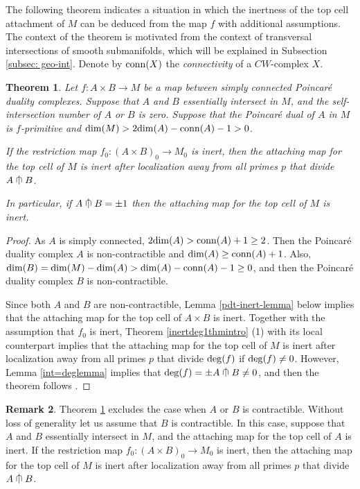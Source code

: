 \documentclass[a4]{amsart}
\newtheorem{theorem}{Theorem}[section]
\theoremstyle{definition}
\newtheorem{remark}[theorem]{Remark}
\newcommand{\testcap}{\mathrel{\vcenter{\offinterlineskip
\hbox{$\cap$}\vskip-1.8ex\hbox{$\kern0.2em | \kern0.15em$}}}}
\begin{document}
\begin{sloppypar}
The following theorem indicates a situation in which the inertness of the top cell attachment of $M$ can be deduced from the map $f$ with additional assumptions. The context of the theorem is motivated from the context of transversal intersections of smooth submanifolds, which will be explained in Subsection \ref{subsec: geo-int}. Denote by ${\rm conn}(X)$ the {\it connectivity} of a $CW$-complex $X$. 
  
\begin{theorem}\label{pdtintthm}
Let $f: A\times B\stackrel{}{\longrightarrow} M$ be a map between simply connected Poincar\'{e} duality complexes. Suppose that $A$ and $B$ essentially intersect in $M$, and the self-intersection number of $A$ or $B$ is zero. Suppose that the Poincar\'{e} dual of $A$ in $M$ is $f$-primitive and ${\rm dim}(M)>2{\rm dim}(A)-{\rm conn}(A)-1>0$. 

If the restriction map 
$
f_0: (A\times B)_0\stackrel{}{\longrightarrow} M_0
$ 
is inert, then the attaching map for the top cell of $M$ is inert after localization away from all primes $p$ that divide $A\testcap B$.

In particular, if $A\testcap B=\pm 1$ then the attaching map for the top cell of $M$ is inert. 
\end{theorem}
\begin{proof} 
As $A$ is simply connected, $2{\rm dim}(A)>{\rm conn}(A)+1\geq 2$. Then the Poincar\'{e} duality complex $A$ is non-contractible and ${\rm dim}(A)\geq {\rm conn}(A)+1$. Also, ${\rm dim}(B)={\rm dim}(M)-{\rm dim}(A)>{\rm dim}(A)-{\rm conn}(A)-1\geq 0$, and then the Poincar\'{e} duality complex $B$ is non-contractible.

Since both $A$ and $B$ are non-contractible, Lemma \ref{pdt-inert-lemma} below implies that  the attaching map for the top cell of $A\times B$ is inert. Together with the assumption that $f_0$ is inert, Theorem \ref{inertdeg1thmintro} (1) with its local counterpart implies that the attaching map for the top cell of $M$ is inert after localization away from all primes $p$ that divide ${\rm deg}(f)$ if ${\rm deg}(f)\neq 0$. However, Lemma \ref{int=deglemma} implies that ${\rm deg}(f)=\pm A\testcap B\neq 0$, and then the theorem follows .
\end{proof}

\begin{remark}
Theorem \ref{pdtintthm} excludes the case when $A$ or $B$ is contractible. 
Without loss of generality let us assume that $B$ is contractible. In this case, suppose that $A$ and $B$ essentially intersect in $M$, and the attaching map for the top cell of $A$ is inert. If the restriction map $f_0: (A\times B)_0\stackrel{}{\longrightarrow} M_0$ is inert, then the attaching map for the top cell of $M$ is inert after localization away from all primes $p$ that divide $A\testcap B$.


\end{remark}
\end{sloppypar}
\end{document}
